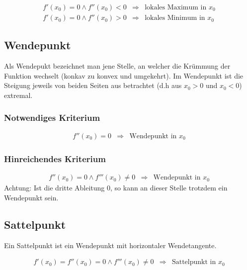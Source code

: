 \[ \boxed{ \begin{matrix}
f'(x_0) = 0 \land f''(x_0) < 0 & \Rightarrow & \text{lokales Maximum in $x_0$} \\
f'(x_0) = 0 \land f''(x_0) > 0 & \Rightarrow & \text{lokales Minimum in $x_0$} 
\end{matrix} } \]

\subsection{Wendepunkt}
Als Wendepukt bezeichnet man jene Stelle, an welcher die Krümmung der Funktion wechselt (konkav zu konvex und umgekehrt).
Im Wendepunkt ist die Steigung jeweils von beiden Seiten aus betrachtet (d.h aus $x_0 > 0$ und $x_0<0$) extremal.

\subsubsection{Notwendiges Kriterium}
\[ \boxed{ \begin{matrix}
f''(x_0) = 0 & \Rightarrow & \text{Wendepunkt in $x_0$}
\end{matrix} } \]

\subsubsection{Hinreichendes Kriterium}
\[ \boxed{ \begin{matrix}
f''(x_0) = 0 \land f'''(x_0) \neq 0 & \Rightarrow & \text{Wendepunkt in $x_0$}
\end{matrix} } \]
Achtung: Ist die dritte Ableitung 0, so kann an dieser Stelle trotzdem ein Wendepunkt sein. 

\subsection{Sattelpunkt}
Ein Sattelpunkt ist ein Wendepunkt mit horizontaler Wendetangente.

\[ \boxed{ \begin{matrix}
f'(x_0) =  f''(x_0) = 0 \land f'''(x_0) \neq 0 & \Rightarrow & \text{Sattelpunkt in $x_0$}
\end{matrix} } \]